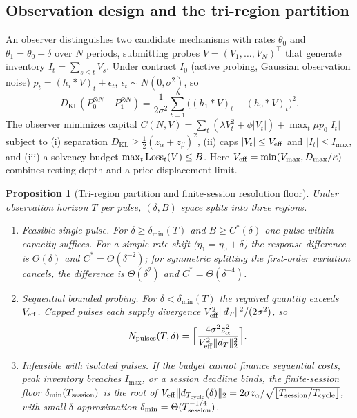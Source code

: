 \documentclass[12pt]{article}
\newtheorem{proposition}[theorem]{Proposition}
\theoremstyle{definition}
\theoremstyle{remark}
\newcommand{\KL}{D_{\mathrm{KL}}}
\begin{document}
\subsection{Observation design and the tri-region partition}

An observer distinguishes two candidate mechanisms with rates $\theta_0$ and $\theta_1=\theta_0+\delta$ over $N$ periods, submitting probes $V=(V_1,\ldots,V_N)^\top$ that generate inventory $I_t=\sum_{s\le t}V_s$. Under contract $I_0$ (active probing, Gaussian observation noise) $p_t=(h_i*V)_t+\epsilon_t$, $\epsilon_t\sim N(0,\sigma^2)$, so
\begin{equation}\label{eq:klconv}
\KL(P_0^{\otimes N}\|P_1^{\otimes N})=\frac1{2\sigma^2}\sum_{t=1}^N\bigl((h_1*V)_t-(h_0*V)_t\bigr)^2 .
\end{equation}
The observer minimizes capital $C(N,V)=\sum_t(\lambda V_t^2+\phi|V_t|)+\max_t\mu p_0|I_t|$ subject to (i) separation $\KL\ge\tfrac12(z_\alpha+z_\beta)^2$, (ii) caps $|V_t|\le V_{\rm eff}$ and $|I_t|\le I_{\max}$, and (iii) a solvency budget $\max_t{\rm Loss}_t(V)\le B$. Here $V_{\rm eff}=\min(V_{\max},D_{\max}/\kappa)$ combines resting depth and a price-displacement limit.

\begin{proposition}[Tri-region partition and finite-session resolution floor]\label{prop:tri}
Under observation horizon $T$ per pulse, $(\delta,B)$ space splits into three regions.
\begin{enumerate}[label=(\roman*)]
\item \emph{Feasible single pulse.} For $\delta\ge\delta_{\min}(T)$ and $B\ge C^*(\delta)$ one pulse within capacity suffices. For a simple rate shift ($\eta_1=\eta_0+\delta$) the response difference is $\Theta(\delta)$ and $C^*=\Theta(\delta^{-2})$; for symmetric splitting the first-order variation cancels, the difference is $\Theta(\delta^2)$ and $C^*=\Theta(\delta^{-4})$.
\item \emph{Sequential bounded probing.} For $\delta<\delta_{\min}(T)$ the required quantity exceeds $V_{\rm eff}$. Capped pulses each supply divergence $V_{\rm eff}^2\|d_T\|^2/(2\sigma^2)$, so
\begin{equation}\label{eq:npulses}
N_{\rm pulses}(T,\delta)=\Bigl\lceil\frac{4\sigma^2z_\alpha^2}{V_{\rm eff}^2\|d_T\|_2^2}\Bigr\rceil .
\end{equation}
\item \emph{Infeasible with isolated pulses.} If the budget cannot finance sequential costs, peak inventory breaches $I_{\max}$, or a session deadline binds, the finite-session floor $\delta_{\min}(T_{\rm session})$ is the root of $V_{\rm eff}\|d_{T_{\rm cycle}}(\delta)\|_2=2\sigma z_\alpha/\sqrt{\lfloor T_{\rm session}/T_{\rm cycle}\rfloor}$, with small-$\delta$ approximation $\delta_{\min}=\Theta(T_{\rm session}^{-1/4})$.
\end{enumerate}
\end{proposition}
\end{document}
